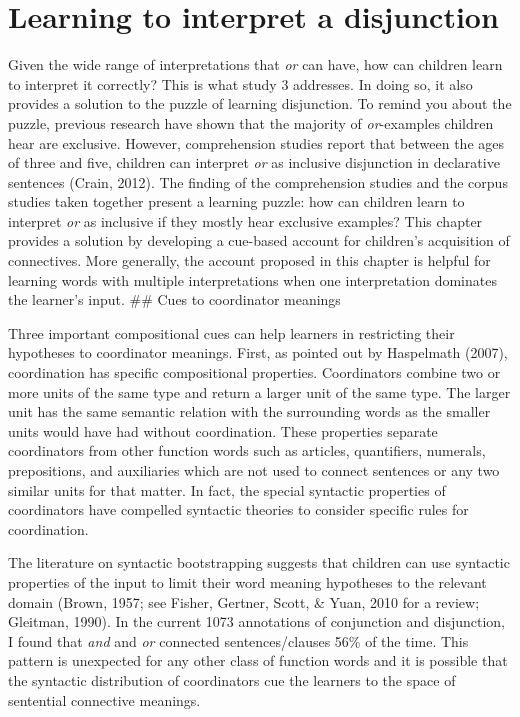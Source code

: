 \documentclass[floatsintext,man]{apa6}
\theoremstyle{definition}
\theoremstyle{definition}
\theoremstyle{definition}
\theoremstyle{remark}
\begin{document}
\section{Learning to interpret a
disjunction}\label{learning-to-interpret-a-disjunction}

Given the wide range of interpretations that \emph{or} can have, how can
children learn to interpret it correctly? This is what study 3
addresses. In doing so, it also provides a solution to the puzzle of
learning disjunction. To remind you about the puzzle, previous research
have shown that the majority of \emph{or}-examples children hear are
exclusive. However, comprehension studies report that between the ages
of three and five, children can interpret \emph{or} as inclusive
disjunction in declarative sentences (Crain, 2012). The finding of the
comprehension studies and the corpus studies taken together present a
learning puzzle: how can children learn to interpret \emph{or} as
inclusive if they mostly hear exclusive examples? This chapter provides
a solution by developing a cue-based account for children's acquisition
of connectives. More generally, the account proposed in this chapter is
helpful for learning words with multiple interpretations when one
interpretation dominates the learner's input. \#\# Cues to coordinator
meanings

Three important compositional cues can help learners in restricting
their hypotheses to coordinator meanings. First, as pointed out by
Haspelmath (2007), coordination has specific compositional properties.
Coordinators combine two or more units of the same type and return a
larger unit of the same type. The larger unit has the same semantic
relation with the surrounding words as the smaller units would have had
without coordination. These properties separate coordinators from other
function words such as articles, quantifiers, numerals, prepositions,
and auxiliaries which are not used to connect sentences or any two
similar units for that matter. In fact, the special syntactic properties
of coordinators have compelled syntactic theories to consider specific
rules for coordination.

The literature on syntactic bootstrapping suggests that children can use
syntactic properties of the input to limit their word meaning hypotheses
to the relevant domain (Brown, 1957; see Fisher, Gertner, Scott, \&
Yuan, 2010 for a review; Gleitman, 1990). In the current 1073
annotations of conjunction and disjunction, I found that \emph{and} and
\emph{or} connected sentences/clauses 56\% of the time. This pattern is
unexpected for any other class of function words and it is possible that
the syntactic distribution of coordinators cue the learners to the space
of sentential connective meanings.
\end{document}
